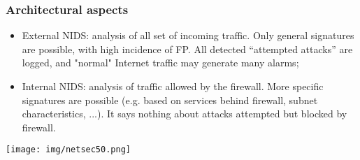 \documentclass[a4paper, 10pt, titlepage]{article}
\begin{document}
\subsubsection*{Architectural aspects}
\begin{itemize}
	\item External NIDS: analysis of all set of incoming traffic. Only general signatures are possible, with high incidence of FP. All detected “attempted attacks” are logged, and "normal" Internet traffic may generate many alarms;
	\item Internal NIDS: analysis of traffic allowed by the firewall. More specific signatures are possible (e.g. based on services behind firewall, subnet characteristics, ...). It says nothing about attacks attempted but blocked by firewall.
\end{itemize}
\begin{center}
	\texttt{[image: img/netsec50.png]}
\end{center}
\end{document}
